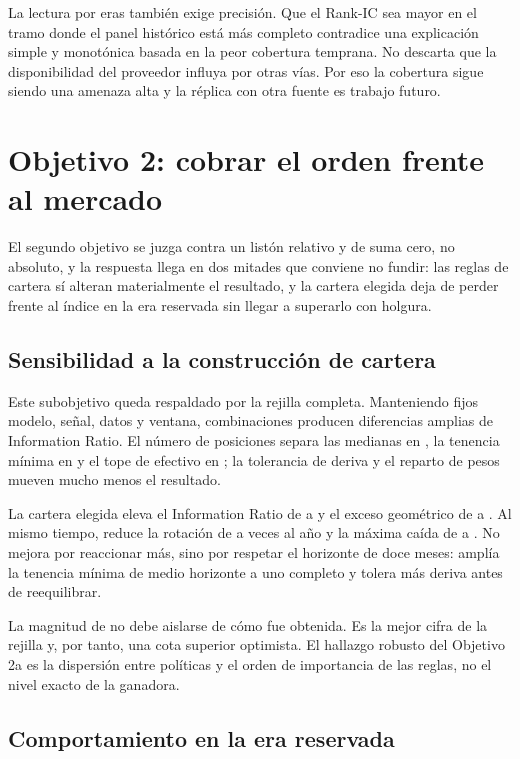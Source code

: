 La lectura por eras también exige precisión. Que el Rank-IC sea mayor en el tramo donde el panel
histórico está más completo contradice una explicación simple y monotónica basada en la peor
cobertura temprana. No descarta que la disponibilidad del proveedor influya por otras vías. Por eso
la cobertura sigue siendo una amenaza alta y la réplica con otra fuente es trabajo futuro.

\section{Objetivo 2: cobrar el orden frente al mercado}

El segundo objetivo se juzga contra un listón relativo y de suma cero, no absoluto, y la respuesta
llega en dos mitades que conviene no fundir: las reglas de cartera sí alteran materialmente el
resultado, y la cartera elegida deja de perder frente al índice en la era reservada sin llegar a
superarlo con holgura.

\subsection{Sensibilidad a la construcción de cartera}

Este subobjetivo queda respaldado por la rejilla completa. Manteniendo fijos modelo, señal, datos y
ventana, \NumCarteras{} combinaciones producen diferencias amplias de Information Ratio. El número
de posiciones separa las medianas en \InfluenciaPosiciones{}, la tenencia mínima en
\InfluenciaTenencia{} y el tope de efectivo en \InfluenciaEfectivo{}; la tolerancia de deriva y el
reparto de pesos mueven mucho menos el resultado.

La cartera elegida eleva el Information Ratio de \IRModelo{} a \IRCartera{} y el exceso geométrico
de \ExcesoModelo{} a \ExcesoCartera{}. Al mismo tiempo, reduce la rotación de \TurnoverModelo{} a
\TurnoverCartera{} veces al año y la máxima caída de \MDDModelo{} a \MDDCartera{}. No mejora por
reaccionar más, sino por respetar el horizonte de doce meses: amplía la tenencia mínima de medio
horizonte a uno completo y tolera más deriva antes de reequilibrar.

La magnitud de \IRCartera{} no debe aislarse de cómo fue obtenida. Es la mejor cifra de la rejilla y,
por tanto, una cota superior optimista. El hallazgo robusto del Objetivo 2a es la dispersión entre
políticas y el orden de importancia de las reglas, no el nivel exacto de la ganadora.

\subsection{Comportamiento en la era reservada}

